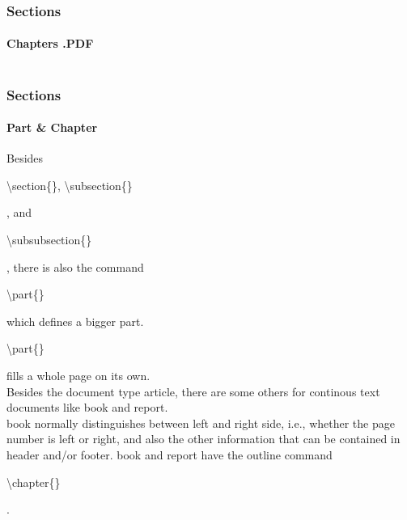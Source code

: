 \begin{frame}
\frametitle{Sections}
\framesubtitle{Chapters .PDF}
\begin{columns}
\begin{column}{0.45\textwidth}
\begin{ttfamily}\scriptsize

\end{ttfamily}
\end{column}
\begin{column}{0.55\textwidth}
\end{column}
\end{columns}
\end{frame}


\begin{frame}
\frametitle{Sections}
\framesubtitle{Part \& Chapter}
Besides \begin{ttfamily}\color{unibablueI}\textbackslash section\color{black}\{\},
\color{unibablueI}\textbackslash subsection\color{black}\{\}\end{ttfamily}, and \begin{ttfamily}\color{unibablueI}\textbackslash subsubsection\color{black}\{\}\end{ttfamily}, there is also the command
 \begin{ttfamily}\color{unibablueI}\textbackslash part\color{black}\{\}\end{ttfamily} which defines a bigger part.
\begin{ttfamily}\color{unibablueI}\textbackslash part\color{black}\{\}\end{ttfamily} fills a whole page on its own.\\
Besides the document type {\ttfamily article}, there are some others for continous
text documents like {\ttfamily book} and {\ttfamily report}.\\
{\ttfamily book} normally distinguishes between left and right side, 
i.e., whether the page number is left or right, and also the other information that can be contained in header and/or footer.
{\ttfamily book} and {\ttfamily report} have the outline
command \begin{ttfamily}\color{unibablueI}\textbackslash chapter\color{black}\{\}\end{ttfamily}.

\end{frame}


